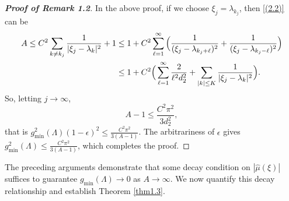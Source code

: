 \documentclass[12pt,psfig,reqno]{amsart}
\numberwithin{equation}{section}
\theoremstyle{plain}
\begin{document}
\begin{proof}[\textbf{Proof of Remark 1.2}]
	In the above proof, if we choose $\xi_j=\lambda_{k_j}$, then \eqref{(2.2)}
	can be \begin{align*}
		A\leq C^2\sum_{k\neq k_j}\frac{1}{|\xi_{j}-\lambda_k|^2}+1
		&\leq 1+C^2\sum_{\ell=1}^\infty\Big(\frac{1}{(\xi_j-\lambda_{k_j+\ell})^2}+\frac{1}{(\xi_j-\lambda_{k_j-\ell})^2}\Big)
		\\
		&\notag\leq 1+C^2\Big(\sum_{\ell=1}^\infty\frac{2}{\ell^2 d_2^2}+\sum_{|k|\leq K}\frac{1}{|\xi_{j}-\lambda_k|^2}\Big).
	\end{align*}
	So, letting $j\rightarrow\infty$, 
	$$
	A-1\leq \frac{C^2\pi^2}{3d_2^2},
	$$
	that is $g_{\min}^2(\Lambda)(1-\epsilon)^2\leq \frac{C^2\pi^2}{3(A-1)}$. 
	The arbitrariness of $\epsilon$ gives $g_{\min}^2(\Lambda)\leq \frac{C^2\pi^2}{3(A-1)}$, which completes the proof. 	
\end{proof}
The preceding arguments demonstrate that some  decay condition on $|\widehat{\mu}(\xi)|$ suffices to guarantee $g_{\min}(\Lambda) \to 0$ as $A \to \infty$. We now quantify this decay relationship and establish Theorem \ref{thm1.3}.
\end{document}
